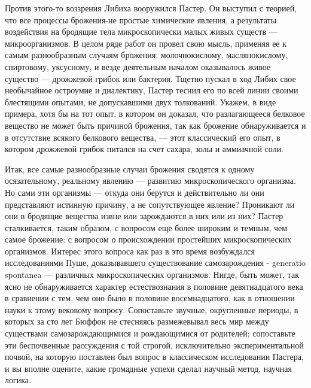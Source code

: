 Против  этого-то воззрения  Либиха  вооружился Пастер.  Он выступил  с
теорией, что  все процессы  брожения-не простые химические  явления, а
результаты воздействия  на бродящие  тела микроскопически  малых живых
существ --- микроорганизмов. В целом  ряде работ он провел свою мысль,
применяя ее  к самым  разнообразным случаям  брожения: молочнокислому,
маслянокислому,  спиртовому,  уксусному,  и везде  деятельным  началом
оказывалось живое  существо --- дрожжевой грибок  или бактерия. Тщетно
пускал в  ход Либих  свое необычайное  остроумие и  диалектику, Пастер
теснил его  по всей линии  своими блестящими опытами,  не допускавшими
двух  толкований. Укажем,  в  виде примера,  хотя бы  на  тот опыт,  в
котором он доказал, что разлагающееся  белковое вещество не может быть
причиной  брожения, так  как  брожение обнаруживается  и в  отсутствие
всякого белкового вещества, --- этот  классический его опыт, в котором
дрожжевой грибок питался на счет сахара, золы и аммиачной соли.

Итак,  все  самые  разнообразные  случаи брожения  сводятся  к  одному
осязательному,  реальному   явлению  ---   развитию  микроскопического
организма.  Но   сами  эти   организмы  ---   откуда  они   берутся  и
действительно ли они представляют истинную причину, а не сопутствующее
явление? Проникают ли они в  бродящие вещества извне или зарождаются в
них  или  из  них?  Пастер сталкивается,  таким  образом,  с  вопросом
еще  более  широким  и  темным,  чем  самое  брожение:  с  вопросом  о
происхождении  простейших микроскопических  организмов. Интерес  этого
вопроса  как   раз  в  это  время   возбуждался  исследованиями  Пуше,
доказывавшего существование  самозарождения - generatio  spontanea ---
различных  микроскопических организмов.  Нигде, быть  может, так  ясно
не  обнаруживается характер  естествознания в  половине девятнадцатого
века  в сравнении  с  тем,  чем оно  было  в половине  восемнадцатого,
как  в   отношении  науки   к  этому  вековому   вопросу.  Сопоставьте
звучные,  округленные  периоды,  в  которых   за  сто  лет  Бюффон  не
стесняясь размежевывал весь мир  между существами самозарождающимися и
рождающимися  от родителей;  сопоставьте эти  беспочвенные рассуждения
с  той строгой,  исключительно  экспериментальной  почвой, на  которую
поставлен был вопрос в классическом  исследовании Пастера, и вы вполне
оцените, какие громадные успехи сделал научный метод, научная логика.

